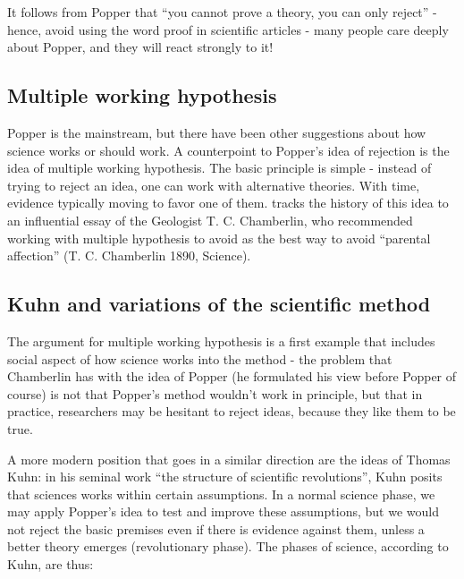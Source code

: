\documentclass{tufte-book}
\begin{document}
It follows from Popper that ``you cannot prove a theory, you can only reject'' - hence, avoid using the word proof in scientific articles - many people care deeply about Popper, and they will react strongly to it! 






\subsection{Multiple working hypothesis}

Popper is the mainstream, but there have been other suggestions about how science works or should work. A counterpoint to Popper's idea of rejection is the idea of multiple working hypothesis. The basic principle is simple - instead of trying to reject an idea, one can work with alternative theories. With time, evidence typically moving to favor one of them. \citet{Platt-StrongInferenceCertain-1964} tracks the history of this idea to an influential essay of the Geologist T. C. Chamberlin, who recommended working with multiple hypothesis to avoid as the best way to avoid “parental affection” (T. C. Chamberlin 1890, Science).

\subsection{Kuhn and variations of the scientific method}

The argument for multiple working hypothesis is a first example that includes social aspect of how science works into the method - the problem that Chamberlin has with the idea of Popper (he formulated his view before Popper of course) is not that Popper's method wouldn't work in principle, but that in practice, researchers may be hesitant to reject ideas, because they like them to be true. 

A more modern position that goes in a similar direction are the ideas of Thomas Kuhn: in his seminal work ``the structure of scientific revolutions'', Kuhn posits that sciences works within certain assumptions. In a normal science phase, we may apply Popper's idea to test and improve these assumptions, but we would not reject the basic premises even if there is evidence against them, unless a better theory emerges (revolutionary phase). The phases of science, according to Kuhn, are thus:
\end{document}
